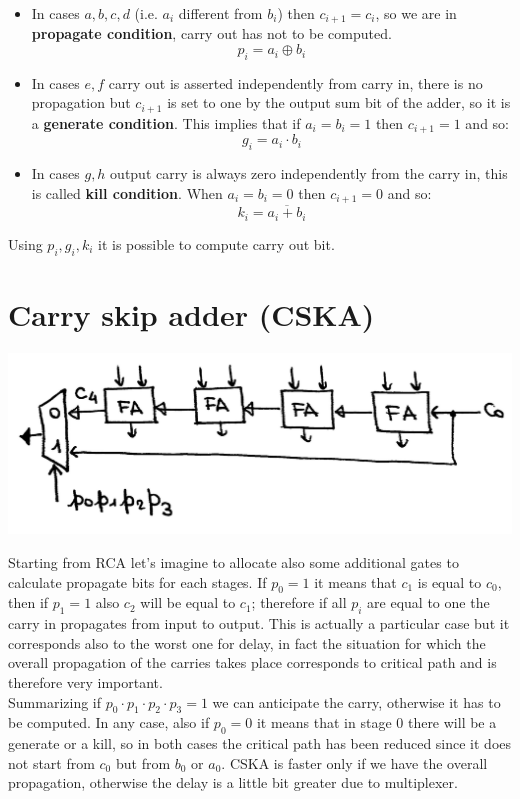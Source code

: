 \begin{itemize}
  \item  In cases $a,b,c,d$ (i.e. $a_i$ different from $b_i$) then $c_{i+1}= c_i$, so we are in \textbf{propagate condition}, carry out has not to be computed.
  $$p_i=a_i \oplus b_i$$

  \item In cases $e,f$ carry out is asserted independently from carry in, there is no propagation but $c_{i+1}$ is set to one by the output sum bit of the adder, so it is a \textbf{generate condition}. This implies that if $a_i=b_i=1$ then $c_{i+1}=1$ and so:
  $$g_i=a_i \cdot b_i$$

  \item In cases $g, h$ output carry is always zero independently from the carry in, this is called \textbf{kill condition}. When $a_i=b_i=0$ then $c_{i+1}=0$ and so:
  $$k_i=\overline{a_i+b_i}$$

\end{itemize}

Using $p_i, g_i, k_i$ it is possible to compute carry out bit.

\section{Carry skip adder (CSKA)}

\begin{center}
  \includegraphics[width=0.7\linewidth]{img/img2/4}
\end{center}


Starting from RCA let's imagine to allocate also some additional gates to calculate propagate bits for each stages. If $p_0=1$ it means that $c_1$ is equal to $c_0$, then if $p_1=1$ also $c_2$ will be equal to $c_1$; therefore if all $p_i$ are equal to one the carry in propagates from input to output. This is actually a particular case but it corresponds also to the worst one for delay, in fact the situation for which the overall propagation of the carries takes place corresponds to critical path and is therefore very important.\\

Summarizing if $p_0\cdot p_1 \cdot p_2 \cdot p_3=1$ we can anticipate the carry, otherwise it has to be computed. In any case, also if $p_0=0$ it means that in stage 0 there will be a generate or a kill, so in both cases the critical path has been reduced since it does not start from $c_0$ but from $b_0$ or $a_0$. CSKA is faster only if we have the overall propagation, otherwise the delay is a little bit greater due to multiplexer.

